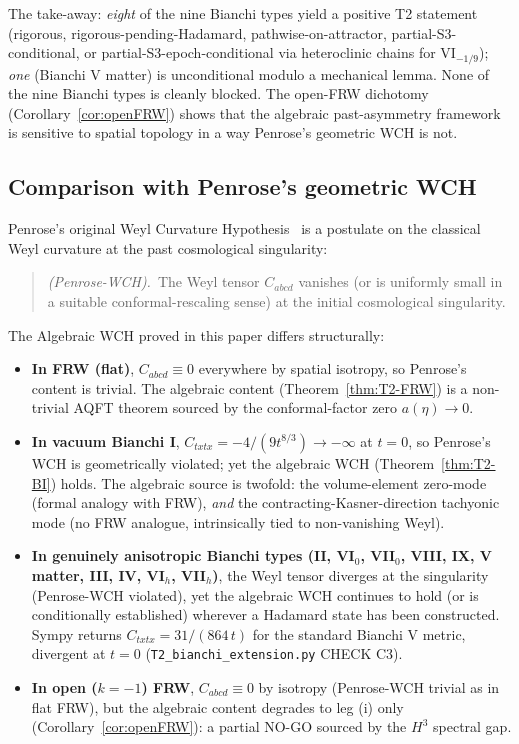 \documentclass[11pt]{article}
\theoremstyle{definition}
\begin{document}
The take-away: \emph{eight} of the nine Bianchi types yield a positive T2 statement (rigorous, rigorous-pending-Hadamard, pathwise-on-attractor, partial-S3-conditional, or partial-S3-epoch-conditional via heteroclinic chains for VI$_{-1/9}$); \emph{one} (Bianchi V matter) is unconditional modulo a mechanical lemma. None of the nine Bianchi types is cleanly blocked. The open-FRW dichotomy (Corollary~\ref{cor:openFRW}) shows that the algebraic past-asymmetry framework is sensitive to spatial topology in a way Penrose's geometric WCH is not.

\subsection{Comparison with Penrose's geometric WCH}\label{sec:penrose}

Penrose's original Weyl Curvature Hypothesis~\cite{Penrose1979,Penrose2010} is a postulate on the classical Weyl curvature at the past cosmological singularity:
\begin{quote}
\emph{(Penrose-WCH).}~The Weyl tensor $C_{abcd}$ vanishes (or is uniformly small in a suitable conformal-rescaling sense) at the initial cosmological singularity.
\end{quote}
The Algebraic WCH proved in this paper differs structurally:
\begin{itemize}
\item \textbf{In FRW (flat)}, $C_{abcd}\equiv 0$ everywhere by spatial isotropy, so Penrose's content is trivial. The algebraic content (Theorem~\ref{thm:T2-FRW}) is a non-trivial AQFT theorem sourced by the conformal-factor zero $a(\eta)\to 0$.
\item \textbf{In vacuum Bianchi I}, $C_{txtx} = -4/(9 t^{8/3})\to-\infty$ at $t=0$, so Penrose's WCH is geometrically violated; yet the algebraic WCH (Theorem~\ref{thm:T2-BI}) holds. The algebraic source is twofold: the volume-element zero-mode (formal analogy with FRW), \emph{and} the contracting-Kasner-direction tachyonic mode (no FRW analogue, intrinsically tied to non-vanishing Weyl).
\item \textbf{In genuinely anisotropic Bianchi types (II, VI$_0$, VII$_0$, VIII, IX, V matter, III, IV, VI$_h$, VII$_h$)}, the Weyl tensor diverges at the singularity (Penrose-WCH violated), yet the algebraic WCH continues to hold (or is conditionally established) wherever a Hadamard state has been constructed. Sympy returns $C_{txtx}=31/(864\,t)$ for the standard Bianchi V metric, divergent at $t=0$ (\texttt{T2\_bianchi\_extension.py} CHECK C3).
\item \textbf{In open ($k=-1$) FRW}, $C_{abcd}\equiv 0$ by isotropy (Penrose-WCH trivial as in flat FRW), but the algebraic content degrades to leg (i) only (Corollary~\ref{cor:openFRW}): a partial NO-GO sourced by the $H^3$ spectral gap.
\end{itemize}
\end{document}
